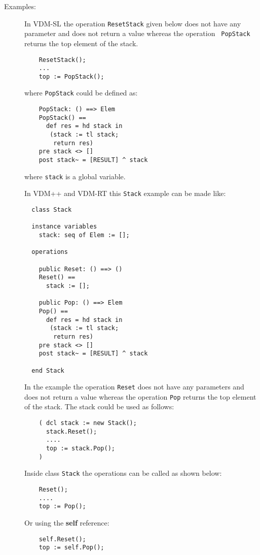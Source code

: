 \documentclass{overturerepchap}
\newcommand{\keyw}[1]{{\bf\ttfamily #1}}
\begin{document}
{\begin{description}
\item[Examples:] \mbox{}
  In VDM-SL the operation {\tt ResetStack} given below does not
  have any parameter and does not return a value whereas the operation {\tt
    PopStack} returns the top element of the stack.
  \begin{lstlisting}
    ResetStack();
    ...
    top := PopStack();
  \end{lstlisting}
  where {\tt PopStack} could be defined as:
  \begin{lstlisting}
    PopStack: () ==> Elem
    PopStack() ==
      def res = hd stack in
       (stack := tl stack;
        return res)
    pre stack <> []
    post stack~ = [RESULT] ^ stack
  \end{lstlisting}
  where {\tt stack} is a global variable.

  In VDM++ and VDM-RT this {\tt Stack} example can be made like:

  \begin{lstlisting}
  class Stack

  instance variables
    stack: seq of Elem := [];

  operations

    public Reset: () ==> ()
    Reset() ==
      stack := [];

    public Pop: () ==> Elem
    Pop() ==
      def res = hd stack in
       (stack := tl stack;
        return res)
    pre stack <> []
    post stack~ = [RESULT] ^ stack

  end Stack
  \end{lstlisting}

  In the example the operation {\tt Reset} does not have any parameters
  and does not return a value whereas the operation {\tt Pop} returns
  the top element of the stack. The stack could be used as follows:
  \begin{lstlisting}
    ( dcl stack := new Stack();
      stack.Reset();
      ....
      top := stack.Pop();
    )
  \end{lstlisting}

  Inside class {\tt Stack} the operations can be called as shown below:
  \begin{lstlisting}
    Reset();
    ....
    top := Pop();
  \end{lstlisting}

  Or using the \keyw{self} reference:
  \begin{lstlisting}
    self.Reset();
    top := self.Pop();
  \end{lstlisting}
\end{description}

}
\end{document}

